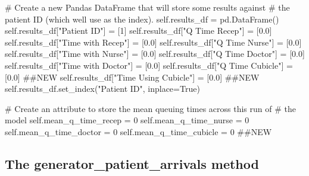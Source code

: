 \documentclass[
  letterpaper,
  DIV=11,
  numbers=noendperiod]{scrreprt}
\newenvironment{Shaded}{}{}
\newcommand{\CommentTok}[1]{\textcolor[rgb]{0.42,0.45,0.49}{#1}}
\newcommand{\DecValTok}[1]{\textcolor[rgb]{0.00,0.36,0.77}{#1}}
\newcommand{\FloatTok}[1]{\textcolor[rgb]{0.00,0.36,0.77}{#1}}
\newcommand{\NormalTok}[1]{\textcolor[rgb]{0.14,0.16,0.18}{#1}}
\newcommand{\OperatorTok}[1]{\textcolor[rgb]{0.14,0.16,0.18}{#1}}
\newcommand{\StringTok}[1]{\textcolor[rgb]{0.01,0.18,0.38}{#1}}
\newcommand{\VariableTok}[1]{\textcolor[rgb]{0.89,0.38,0.04}{#1}}
\begin{document}
\begin{Shaded}
\begin{Highlighting}[]
        \CommentTok{\# Create a new Pandas DataFrame that will store some results against}
        \CommentTok{\# the patient ID (which we\textquotesingle{}ll use as the index).}
        \VariableTok{self}\NormalTok{.results\_df }\OperatorTok{=}\NormalTok{ pd.DataFrame()}
        \VariableTok{self}\NormalTok{.results\_df[}\StringTok{"Patient ID"}\NormalTok{] }\OperatorTok{=}\NormalTok{ [}\DecValTok{1}\NormalTok{]}
        \VariableTok{self}\NormalTok{.results\_df[}\StringTok{"Q Time Recep"}\NormalTok{] }\OperatorTok{=}\NormalTok{ [}\FloatTok{0.0}\NormalTok{]}
        \VariableTok{self}\NormalTok{.results\_df[}\StringTok{"Time with Recep"}\NormalTok{] }\OperatorTok{=}\NormalTok{ [}\FloatTok{0.0}\NormalTok{]}
        \VariableTok{self}\NormalTok{.results\_df[}\StringTok{"Q Time Nurse"}\NormalTok{] }\OperatorTok{=}\NormalTok{ [}\FloatTok{0.0}\NormalTok{]}
        \VariableTok{self}\NormalTok{.results\_df[}\StringTok{"Time with Nurse"}\NormalTok{] }\OperatorTok{=}\NormalTok{ [}\FloatTok{0.0}\NormalTok{]}
        \VariableTok{self}\NormalTok{.results\_df[}\StringTok{"Q Time Doctor"}\NormalTok{] }\OperatorTok{=}\NormalTok{ [}\FloatTok{0.0}\NormalTok{]}
        \VariableTok{self}\NormalTok{.results\_df[}\StringTok{"Time with Doctor"}\NormalTok{] }\OperatorTok{=}\NormalTok{ [}\FloatTok{0.0}\NormalTok{]}
        \VariableTok{self}\NormalTok{.results\_df[}\StringTok{"Q Time Cubicle"}\NormalTok{] }\OperatorTok{=}\NormalTok{ [}\FloatTok{0.0}\NormalTok{] }\CommentTok{\#\#NEW}
        \VariableTok{self}\NormalTok{.results\_df[}\StringTok{"Time Using Cubicle"}\NormalTok{] }\OperatorTok{=}\NormalTok{ [}\FloatTok{0.0}\NormalTok{] }\CommentTok{\#\#NEW}
        \VariableTok{self}\NormalTok{.results\_df.set\_index(}\StringTok{"Patient ID"}\NormalTok{, inplace}\OperatorTok{=}\VariableTok{True}\NormalTok{)}

        \CommentTok{\# Create an attribute to store the mean queuing times across this run of}
        \CommentTok{\# the model}
        \VariableTok{self}\NormalTok{.mean\_q\_time\_recep }\OperatorTok{=} \DecValTok{0}
        \VariableTok{self}\NormalTok{.mean\_q\_time\_nurse }\OperatorTok{=} \DecValTok{0}
        \VariableTok{self}\NormalTok{.mean\_q\_time\_doctor }\OperatorTok{=} \DecValTok{0}
        \VariableTok{self}\NormalTok{.mean\_q\_time\_cubicle }\OperatorTok{=} \DecValTok{0} \CommentTok{\#\#NEW}
\end{Highlighting}
\end{Shaded}

\subsection{The generator\_patient\_arrivals
method}\label{the-generator_patient_arrivals-method-3}
\end{document}
